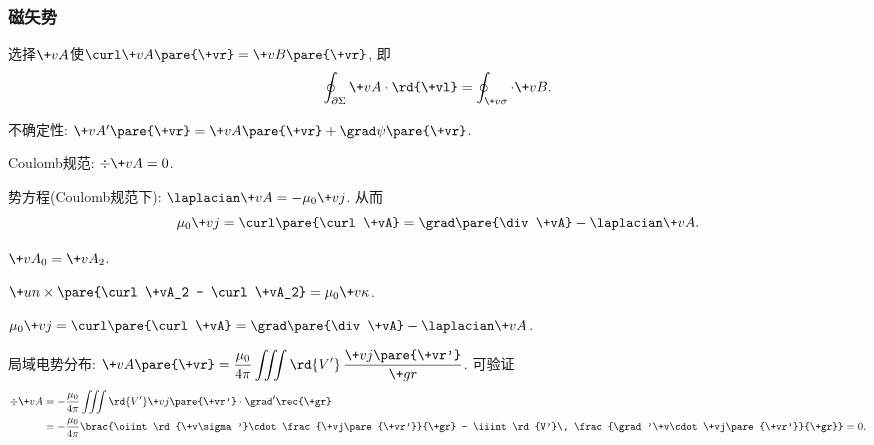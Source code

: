 \documentclass[hidelinks]{ctexart}
\begin{document}
\subsubsection{磁矢势} %
\label{ssub:磁矢势}

选择$\+vA$使$\curl \+vA\pare{\+vr} = \+vB\pare{\+vr}$, 即
\[ \oint_{\partial \Sigma} \+vA\cdot \rd{\+vl} = \oint_{\+v\sigma}\cdot \+vB. \]
\begin{cenum}
    \item 不确定性: $\+vA'\pare{\+vr} = \+vA\pare{\+vr} + \grad \psi\pare{\+vr}$.
    \item Coulomb规范: $\div \+vA = 0$.
    \item 势方程(Coulomb规范下): $\laplacian \+vA = -\mu_0 \+vj$. 从而
    \[ \mu_0 \+vj = \curl\pare{\curl \+vA} = \grad\pare{\div \+vA} - \laplacian \+vA. \]
    \begin{cenum}
        \item $\+vA_0 = \+vA_2$.
        \item $\+un\times \pare{\curl \+vA_2 - \curl \+vA_2} = \mu_0 \+v\kappa$.
        \item $\mu_0 \+vj = \curl\pare{\curl \+vA} = \grad\pare{\div \+vA} - \laplacian \+vA$.
    \end{cenum}
    \item 局域电势分布: $\displaystyle \+vA\pare{\+vr} = \frac{\mu_0}{4\pi} \iiint \rd{V'}\, \frac{\+vj\pare{\+vr'}}{\+gr}$. 可验证
    \begin{align*}
        \div \+vA &= -\frac{\mu_0}{4\pi} \iiint \rd{V'} \+vj\pare{\+vr'}\cdot \grad' \rec{\+gr} \\
        &= -\frac{\mu_0}{4\pi}\brac{\oiint \rd{\+v\sigma'}\cdot \frac{\+vj\pare{\+vr'}}{\+gr} - \iiint \rd{V'}\, \frac{\grad'\+v\cdot \+vj\pare{\+vr'}}{\+gr}} = 0.
    \end{align*}
\end{cenum}
\end{document}
